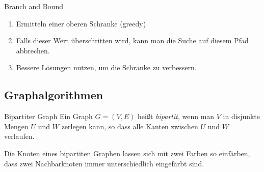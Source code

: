 \documentclass[german]{../spicker}
\begin{document}
\begin{defi}{Branch and Bound}
    \begin{enumerate}
        \item Ermitteln einer oberen Schranke (greedy)
        \item Falls dieser Wert überschritten wird, kann man die Suche auf diesem Pfad abbrechen.
        \item Bessere Lösungen nutzen, um die Schranke zu verbessern.
    \end{enumerate}
\end{defi}


\subsection{Graphalgorithmen}

\begin{defi}{Bipartiter Graph}
    Ein Graph $G=(V, E)$ heißt \emph{bipartit}, wenn man $V$ in disjunkte Mengen $U$ und $W$ zerlegen kann, so dass alle Kanten zwischen $U$ und $W$ verlaufen.

    Die Knoten eines bipartiten Graphen lassen sich mit zwei Farben so einfärben, dass zwei Nachbarknoten immer unterschiedlich eingefärbt sind.
\end{defi}
\end{document}
